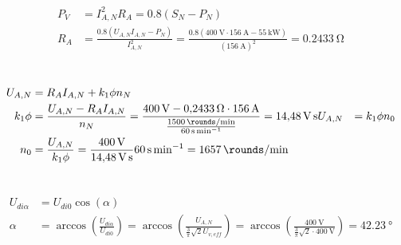 \documentclass[11pt,a4paper]{scrartcl}
\newcommand{\mybr}[1]{\left(#1\right)}
\newcommand{\0}{_{\mybr{0}}}
\newcommand{\1}{_{\mybr{1}}}
\newcommand{\2}{_{\mybr{2}}}
\begin{document}
\section{}
\begin{align}
P_V&=I_{A,N}^2 R_A=\num{0.8}\mybr{S_N-P_N}\\
R_A&=\frac{\num{0.8}\mybr{U_{A,N}I_{A,N}-P_N}}{I_{A,N}^2}=\frac{\num{0.8}\mybr{\SI{400}{\volt}\cdot\SI{156}{\ampere}-\SI{55}{\kilo\watt}}}{\mybr{\SI{156}{\ampere}}^2}=\SI{0.2433}{\ohm}
\end{align}

\section{}
\begin{align}
U_{A,N}&=R_A I_{A,N} + k_1 \phi n_N\\
k_1\phi&=\frac{U_{A,N}-R_A I_{A,N}}{n_N}=\frac{\SI{400}{\volt}-\SI{0.2433}{\ohm}\cdot\SI{156}{\ampere}}{\frac{\SI{1500}{\rounds\per\minute}}{\SI{60}{\second\per\minute}}}=\SI{14.48}{\volt\second}
U_{A,N}&=k_1\phi n_0\\
n_0&=\frac{U_{A,N}}{k_1\phi}=\frac{\SI{400}{\volt}}{\SI{14.48}{\volt\second}}\SI{60}{\second\per\minute}=\SI{1657}{\rounds\per\minute}
\end{align}

\section{}
\begin{align}
U_{di\alpha}&=U_{di0}\cos\mybr{\alpha}\\
\alpha&=\arccos\mybr{\frac{U_{di\alpha}}{U_{di0}}}=\arccos\mybr{\frac{U_{A,N}}{\frac{3}{\pi}\sqrt{2}U_{v,eff}}}=\arccos\mybr{\frac{\SI{400}{\volt}}{\frac{3}{\pi}\sqrt{2}\cdot\SI{400}{\volt}}}=\SI{42.23}{\degree}
\end{align}

\section{}
\end{document}
